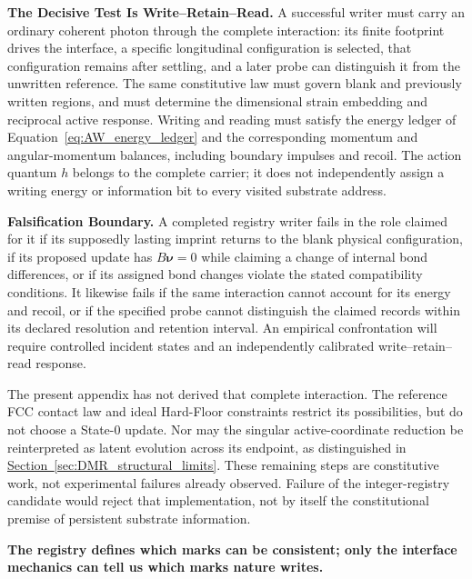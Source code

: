 \begin{itemize}
\end{itemize}

\noindent\textbf{The Decisive Test Is Write--Retain--Read.}
A successful writer must carry an ordinary coherent photon through the
complete interaction: its finite footprint drives the interface, a
specific longitudinal configuration is selected, that configuration
remains after settling, and a later probe can distinguish it from the
unwritten reference. The same constitutive law must govern blank and
previously written regions, and must determine the dimensional strain
embedding and reciprocal active response. Writing and reading must satisfy
the energy ledger of Equation~\eqref{eq:AW_energy_ledger} and the
corresponding momentum and angular-momentum balances, including boundary
impulses and recoil. The action quantum $h$ belongs to the complete
carrier; it does not independently assign a writing energy or information
bit to every visited substrate address.

\noindent\textbf{Falsification Boundary.}
A completed registry writer fails in the role claimed for it if its
supposedly lasting imprint returns to the blank physical configuration,
if its proposed update has $B\boldsymbol\nu=0$ while claiming a change
of internal bond differences, or if its assigned bond changes violate
the stated compatibility conditions. It likewise fails if the same
interaction cannot account for its energy and recoil, or if the
specified probe cannot distinguish the claimed records within its
declared resolution and retention interval. An empirical confrontation
will require controlled incident states and an independently calibrated
write--retain--read response.

The present appendix has not derived that complete interaction. The
reference FCC contact law and ideal Hard-Floor constraints restrict its
possibilities, but do not choose a State-0 update. Nor may the singular
active-coordinate reduction be reinterpreted as latent evolution across
its endpoint, as distinguished in
\hyperref[sec:DMR_structural_limits]{Section~\ref*{sec:DMR_structural_limits}}.
These remaining steps are constitutive work, not experimental failures
already observed. Failure of the integer-registry candidate would reject
that implementation, not by itself the constitutional premise of
persistent substrate information.

\medskip
\noindent\textbf{The registry defines which marks can be consistent;
only the interface mechanics can tell us which marks nature writes.}

